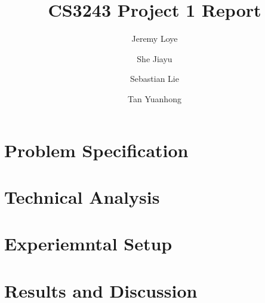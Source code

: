\documentclass{llncs}
\title{CS3243 Project 1 Report}
\author{Jeremy Loye \and She Jiayu \and Sebastian Lie \and Tan Yuanhong}
\institute{National University of Singapore}
\begin{document}
\maketitle
\section{Problem Specification}
\section{Technical Analysis}
\section{Experiemntal Setup}
\section{Results and Discussion}
\end{document}
